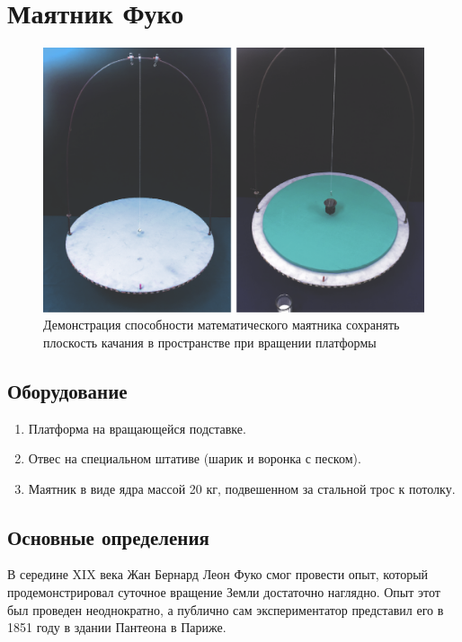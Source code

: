 \documentclass[All.tex]{subfiles}
\begin{document}

		\section{Маятник Фуко}
		

\begin{figure}[H] 	
	\centering 	
	\includegraphics[width=0.8\linewidth]{fuko-1.png}
	\caption{Демонстрация способности математического маятника сохранять плоскость качания в пространстве при вращении платформы}
	\label{fuko-1}
\end{figure}
	
	\subsection*{\textcolor{PineGreen}{Оборудование}}

		\begin{enumerate}
			\item Платформа на вращающейся подставке.
			\item Отвес на специальном штативе (шарик и воронка с песком).
			\item Маятник в виде ядра массой 20 кг, подвешенном за стальной трос к потолку.
		\end{enumerate}

		\subsection*{\textcolor{PineGreen}{Основные определения}}
		
В середине XIX века Жан Бернард Леон Фуко смог провести опыт, который продемонстрировал суточное вращение Земли достаточно наглядно. 
Опыт этот был проведен неоднократно, а публично сам экспериментатор представил его в 1851 году в здании Пантеона в Париже.
									
\end{document}
